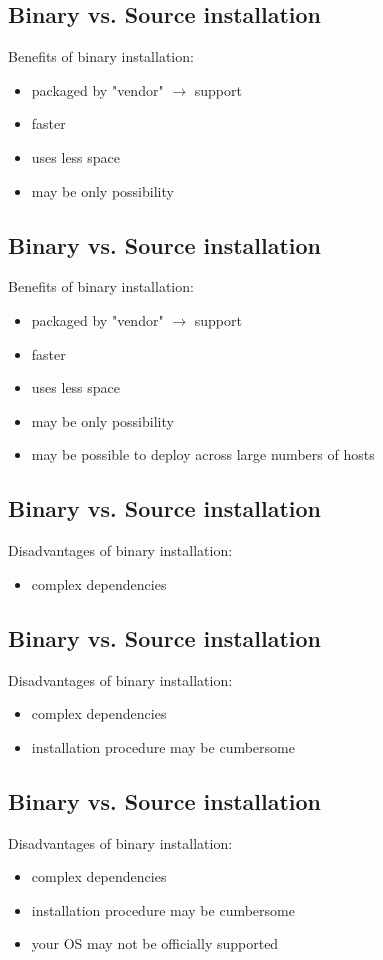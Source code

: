 \documentclass[xga]{xdvislides}
\begin{document}
\subsection{Binary vs. Source installation}
Benefits of binary installation:
\begin{itemize}
	\item packaged by "vendor" $\rightarrow$ support
	\item faster
	\item uses less space
	\item may be only possibility
\end{itemize}

\subsection{Binary vs. Source installation}
Benefits of binary installation:
\begin{itemize}
	\item packaged by "vendor" $\rightarrow$ support
	\item faster
	\item uses less space
	\item may be only possibility
	\item may be possible to deploy across large numbers of hosts
\end{itemize}

\subsection{Binary vs. Source installation}
Disadvantages of binary installation:
\begin{itemize}
	\item complex dependencies
\end{itemize}

\subsection{Binary vs. Source installation}
Disadvantages of binary installation:
\begin{itemize}
	\item complex dependencies
	\item installation procedure may be cumbersome
\end{itemize}

\subsection{Binary vs. Source installation}
Disadvantages of binary installation:
\begin{itemize}
	\item complex dependencies
	\item installation procedure may be cumbersome
	\item your OS may not be officially supported
\end{itemize}
\end{document}
